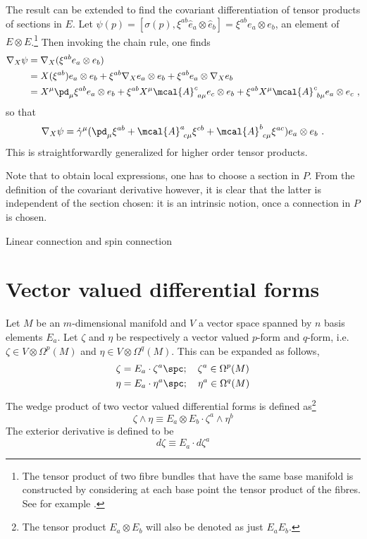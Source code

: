 \documentclass[10pt,reqno]{amsart}
\numberwithin{equation}{section}
\begin{document}
The result can be extended to find the covariant differentiation 
of tensor products of sections in $E$. Let $\psi(p) = [\sigma(p), 
\xi^{ab}\hat{e}_a \otimes \hat{e}_b] = \xi^{ab} e_a \otimes e_b$, 
an element of $E \otimes E$.\footnote{The tensor product of two 
	fibre bundles that have the same base manifold is constructed 
	by considering at each base point the tensor product of the 
	fibres. See for example \cite{nakahara2003geometry}.} Then 
invoking the chain rule, one finds
%
\begin{align*}
	\nabla_X \psi &= \nabla_X (\xi^{ab} e_a \otimes e_b) \\
	&= X(\xi^{ab})e_a \otimes e_b + \xi^{ab} \nabla_X e_a \otimes 
	e_b + \xi^{ab} e_a \otimes \nabla_X e_b \\
	&= X^\mu \pd_\mu\xi^{ab} e_a \otimes e_b + \xi^{ab} X^\mu 
	\mcal{A}^c_{~a\mu} e_c \otimes e_b + \xi^{ab} X^\mu 
	\mcal{A}^c_{~b\mu} e_a \otimes e_c~,
\end{align*}
so that
%
\begin{equation}
	\nabla_X \psi = \dot{\gamma}^\mu (\pd_\mu\xi^{ab} + 
	\mcal{A}^a_{~c\mu}\xi^{cb} + \mcal{A}^b_{~c\mu}\xi^{ac}) e_a 
	\otimes e_b~.
\end{equation}
This is straightforwardly generalized for higher order tensor 
products.

Note that to obtain local expressions, one has to choose a 
section in $P$. From the definition of the covariant derivative 
however, it is clear that the latter is independent of the 
section chosen: it is an intrinsic notion, once a connection in 
$P$ is chosen.

\begin{example}
	Linear connection and spin connection
\end{example}

\appendix
\section{Vector valued differential forms}

Let $M$ be an $m$-dimensional manifold and $V$ a vector space 
spanned by $n$ basis elements $E_a$. Let $\zeta$ and $\eta$ be 
respectively a vector valued $p$-form and $q$-form, i.e.\ $\zeta 
\in V \otimes \Omega^p(M)$ and $\eta \in V \otimes \Omega^q(M)$.  
This can be expanded as follows,
%
\begin{gather*}
	\zeta = E_a \cdot \zeta^a \spc;
	\quad \zeta^a \in \Omega^p(M)\\
	\eta = E_a \cdot \eta^a \spc;
	\quad \eta^a \in \Omega^q(M)
\end{gather*}
%
The wedge product of two vector valued differential forms is 
defined as\footnote{The tensor product $E_a \otimes E_b$ will 
	also be denoted as just $E_a E_b$.}
%
\begin{equation}
	\zeta \wedge \eta \equiv
	E_a \otimes E_b \cdot \zeta^a \wedge \eta^b
\end{equation}
%
The exterior derivative is defined to be
%
\begin{equation}
	d\zeta \equiv E_a \cdot d\zeta^a
\end{equation}
\end{document}
